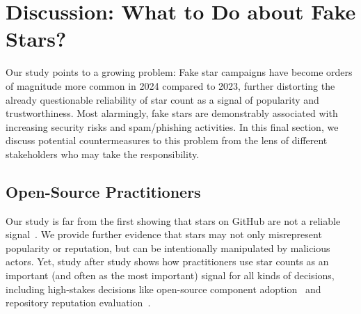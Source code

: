 

\section{Discussion: What to Do about Fake Stars?}
\label{sec:fake-stars-discussion}

Our study points to a growing problem: %
Fake star campaigns have become orders of magnitude more common in 2024 compared to 2023, further distorting the already questionable reliability of star count as a signal of popularity and trustworthiness.
Most alarmingly, fake stars are demonstrably associated with increasing security risks and spam/phishing activities. %
In this final section, we discuss potential countermeasures to this problem from the lens of different stakeholders who may take the responsibility.

\subsection{Open-Source Practitioners}

Our study is far from the first showing that stars on GitHub are not a reliable signal~\cite{koch2024fault, github-star-trust, schueller2024modeling, DBLP:journals/corr/abs-2405-07508}. %
We provide further evidence that stars may not only misrepresent popularity or reputation, but can be intentionally manipulated by malicious actors.
Yet, study after study shows how practitioners use %
star counts as an important (and often as the most important) signal for all kinds of decisions, including high-stakes decisions like open-source component adoption~\cite{DBLP:conf/sigsoft/VargasATBG20, DBLP:conf/sp/WermkeWKFAF22,DBLP:journals/jss/MujahidAS23} and repository reputation evaluation~\cite{DBLP:journals/pacmhci/QiuLPSV19, DBLP:conf/icse/TsayDH14}.%

